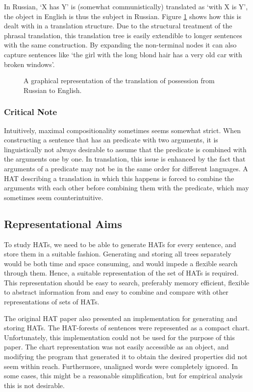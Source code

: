 In Russian, `X has Y' is (somewhat communistically) translated as `with X is Y', the object in English is thus the subject in Russian. Figure \ref{fig:russian1} shows how this is dealt with in a translation structure. Due to the structural treatment of the phrasal translation, this translation tree is easily extendible to longer sentences with the same construction. By expanding the non-terminal nodes it can also capture sentences like `the girl with the long blond hair has a very old car with broken windows'.

\begin{figure}[!ht]
\centering

\caption{A graphical representation of the translation of possession from Russian to English.}\label{fig:russian1}
\end{figure}


\subsubsection{Critical Note}

Intuitively, maximal compositionality sometimes seems somewhat strict. When constructing a sentence that has an predicate with two arguments, it is linguistically not always desirable to assume that the predicate is combined with the arguments one by one. In translation, this issue is enhanced by the fact that arguments of a predicate may not be in the same order for different languages. A HAT describing a translation in which this happens is forced to combine the arguments with each other before combining them with the predicate, which may sometimes seem counterintuitive.


\subsection{Representational Aims}

To study HATs, we need to be able to generate HATs for every sentence, and store them in a suitable fashion. Generating and storing all trees separately would be both time and space consuming, and would impede a flexible search through them. Hence, a suitable representation of the set of HATs is required. This representation should be easy to search, preferably memory efficient, flexible to abstract information from and easy to combine and compare with other representations of sets of HATs.

The original HAT paper also presented an implementation for generating and storing HATs. The HAT-forests of sentences were represented as a compact chart. Unfortunately, this implementation could not be used for the purpose of this paper. The chart representation was not easily accessible as an object, and modifying the program that generated it to obtain the desired properties did not seem within reach. Furthermore, unaligned words were completely ignored. In some cases, this might be a reasonable simplification, but for empirical analysis this is not desirable.


